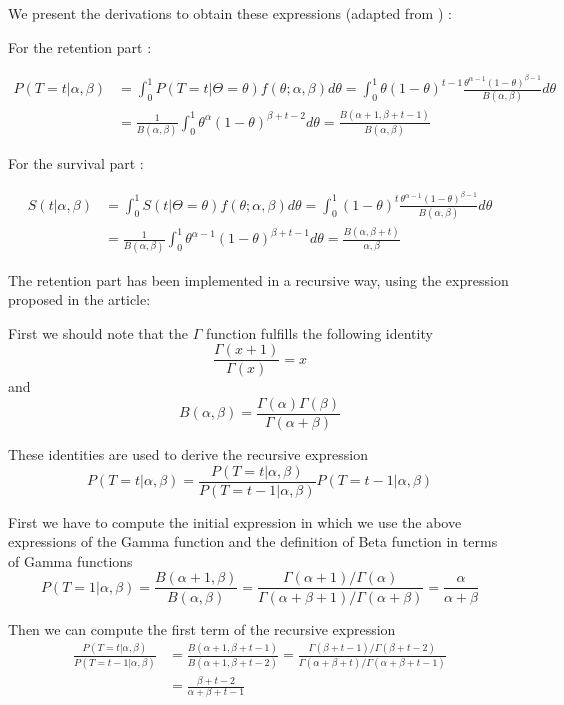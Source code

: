 \documentclass[paper=a4, fontsize=11pt]{scrartcl} %
\numberwithin{equation}{section} %
\numberwithin{figure}{section} %
\numberwithin{table}{section} %
\begin{document}
	We present the derivations to obtain these expressions (adapted from \cite{feder07} ) :
	
	For the retention part : 
	
	\begin{align*}
	P(T=t | \alpha,\beta) &= \int_0^1 P(T=t | \Theta = \theta)f(\theta ;  \alpha,\beta) d\theta = 
	\int_0^1 \theta (1-\theta)^{t-1}  \frac{\theta^{\alpha-1}(1-\theta)^{\beta-1}}{B(\alpha,\beta)} d\theta \\
	&=\frac{1}{B(\alpha,\beta)}  \int_0^1 \theta^{\alpha}(1-\theta)^{\beta+t-2}d\theta
	= \frac{B(\alpha+1,\beta+t-1)}{B(\alpha,\beta)}
	\end{align*} 
	
	For the survival part : 
	
	\begin{align*}
	S(t | \alpha,\beta) &= \int_0^1 S(t | \Theta = \theta)f(\theta ;  \alpha,\beta) d\theta = 
	\int_0^1  (1-\theta)^{t}  \frac{\theta^{\alpha-1}(1-\theta)^{\beta-1}}{B(\alpha,\beta)} d\theta \\
	&=\frac{1}{B(\alpha,\beta)}  \int_0^1 \theta^{\alpha-1}(1-\theta)^{\beta+t-1}d\theta
	= \frac{B(\alpha,\beta+t)}{\alpha,\beta}
	\end{align*} 
	
	The retention part has been implemented in a recursive way, using the expression proposed in the article: 
	
	First we should note that the $\Gamma$ function fulfills the following identity\\
	$$
	\frac{\Gamma(x+1)}{\Gamma(x)}=x
	$$
	and
	$$
	B(\alpha,\beta)=\frac{\Gamma(\alpha)\Gamma(\beta)}{\Gamma(\alpha + \beta)}
	$$
	
	These identities are used to derive the recursive expression\\
	$$
	P(T = t | \alpha,\beta) = \frac{P(T = t | \alpha,\beta)}{P(T = t -1| \alpha,\beta)}P(T = t-1 | \alpha,\beta)
	$$
	
	First we have to compute the initial expression in which we use the above expressions of the Gamma function and the definition of Beta function in terms of Gamma functions\\
	$$
	P(T = 1 | \alpha,\beta) =\frac{B(\alpha+1,\beta)}{B(\alpha,\beta)} = \frac{\Gamma(\alpha + 1)/\Gamma(\alpha)}{\Gamma(\alpha + \beta +1)/\Gamma(\alpha + \beta)} = \frac{\alpha}{\alpha + \beta} 
	$$
	
	Then we can compute the first term of the recursive expression\\
	\begin{align*}
	\frac{P(T = t | \alpha,\beta)}{P(T = t -1| \alpha,\beta)} &= \frac{B(\alpha+1,\beta+t-1)}{B(\alpha+1,\beta+t-2)} =  \frac{\Gamma(\beta + t - 1)/\Gamma(\beta + t -2)}{\Gamma(\alpha + \beta +t)/\Gamma(\alpha + \beta + t -1)} \\ &= \frac{\beta+t-2}{\alpha+\beta+t-1} 
	\end{align*}
	
\end{document}
